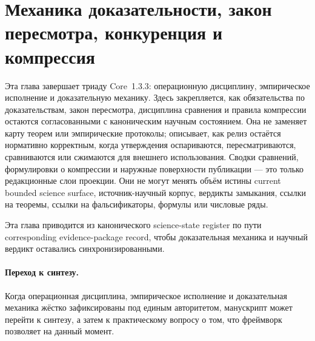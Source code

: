 \section{Механика доказательности, закон пересмотра, конкуренция и компрессия}
\label{sec:oc-core-1-3-proof-machinery}

Эта глава завершает триаду Core~1.3.3: операционную дисциплину, эмпирическое
исполнение и доказательную механику. Здесь закрепляется, как обязательства
по доказательствам, закон пересмотра, дисциплина сравнения и правила
компрессии остаются согласованными с каноническим научным состоянием.
Она не заменяет карту теорем или эмпирические протоколы; описывает, как
релиз остаётся нормативно корректным, когда утверждения оспариваются,
пересматриваются, сравниваются или сжимаются для внешнего использования.
Сводки сравнений, формулировки о компрессии и наружные поверхности
публикации — это только редакционные слои проекции. Они не могут менять
объём истины current bounded science surface, источник-научный корпус,
вердикты замыкания, ссылки на теоремы, ссылки на фальсификаторы,
формулы или числовые ряды.

Эта глава приводится из канонического science-state register
 по пути
corresponding evidence-package record,
чтобы доказательная механика и научный вердикт оставались синхронизированными.



\paragraph{Переход к синтезу.}
Когда операционная дисциплина, эмпирическое исполнение и доказательная
механика жёстко зафиксированы под единым авторитетом, манускрипт может
перейти к синтезу, а затем к практическому вопросу о том, что фреймворк
позволяет на данный момент.
